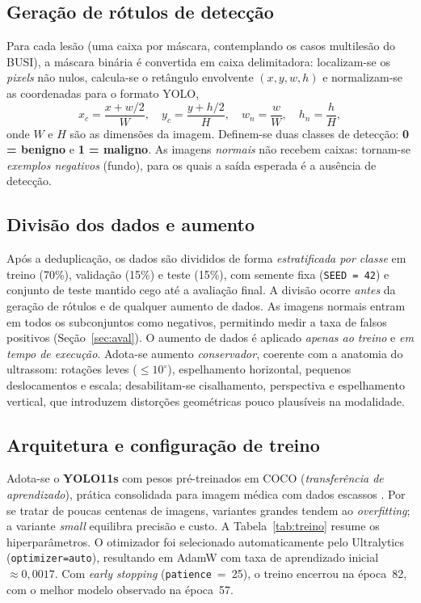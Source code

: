 \documentclass[11pt,a4paper]{article}
\begin{document}
\subsection{Geração de rótulos de detecção}
Para cada lesão (uma caixa por máscara, contemplando os casos multilesão do BUSI),
a máscara binária é convertida em caixa delimitadora: localizam-se os
\textit{pixels} não nulos, calcula-se o retângulo envolvente $(x,y,w,h)$ e
normalizam-se as coordenadas para o formato YOLO,
\[
x_c=\frac{x+w/2}{W},\quad y_c=\frac{y+h/2}{H},\quad
w_n=\frac{w}{W},\quad h_n=\frac{h}{H},
\]
onde $W$ e $H$ são as dimensões da imagem. Definem-se duas classes de detecção:
\textbf{0 = benigno} e \textbf{1 = maligno}. As imagens \emph{normais} não recebem
caixas: tornam-se \emph{exemplos negativos} (fundo), para os quais a saída
esperada é a ausência de detecção.

\subsection{Divisão dos dados e aumento}
Após a deduplicação, os dados são divididos de forma \emph{estratificada por
classe} em treino (70\%), validação (15\%) e teste (15\%), com semente fixa
(\texttt{SEED~=~42}) e conjunto de teste mantido cego até a avaliação final. A
divisão ocorre \emph{antes} da geração de rótulos e de qualquer aumento de dados.
As imagens normais entram em todos os subconjuntos como negativos, permitindo
medir a taxa de falsos positivos (Seção~\ref{sec:aval}). O aumento de dados é
aplicado \emph{apenas ao treino} e \emph{em tempo de execução}. Adota-se aumento
\emph{conservador}, coerente com a anatomia do ultrassom: rotações leves
($\leq 10^\circ$), espelhamento horizontal, pequenos deslocamentos e escala;
desabilitam-se cisalhamento, perspectiva e espelhamento vertical, que introduzem
distorções geométricas pouco plausíveis na modalidade.

\subsection{Arquitetura e configuração de treino}
Adota-se o \textbf{YOLO11s} \citep{jocher2024} com pesos pré-treinados em COCO
(\emph{transferência de aprendizado}), prática consolidada para imagem médica
com dados escassos \citep{prinzi2024}. Por se tratar de poucas centenas de
imagens, variantes grandes tendem ao \textit{overfitting}; a variante
\textit{small} equilibra precisão e custo. A Tabela~\ref{tab:treino} resume os
hiperparâmetros. O otimizador foi selecionado automaticamente pelo Ultralytics
(\texttt{optimizer=auto}), resultando em AdamW com taxa de aprendizado inicial
$\approx 0{,}0017$. Com \emph{early stopping} (\texttt{patience}~=~25), o treino
encerrou na época~82, com o melhor modelo observado na época~57.
\end{document}
